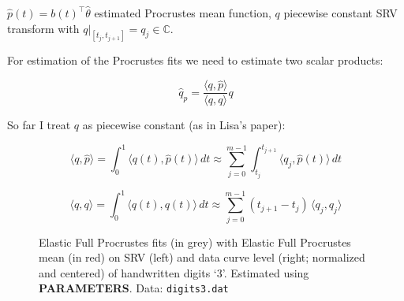 $\hat{p}(t) = b(t)^\top \hat{\theta}$ estimated Procrustes mean function, $q$ piecewise constant SRV transform with $q|_{[t_j, t_{j+1}]} = q_j \in \mathbb{C}$.

For estimation of the Procrustes fits we need to estimate two scalar products:

$$ \hat{q}_{p} = \frac{\langle q,\hat{p} \rangle}{\langle q, q \rangle} q $$

So far I treat $q$ as piecewise constant (as in Lisa's paper):

$$ \langle q, \hat{p} \rangle = \int_0^1 \langle q(t), \hat{p}(t) \rangle \, dt \approx \sum_{j=0}^{m-1} \int_{t_j}^{t_{j+1}} \langle q_j, \hat{p}(t) \rangle \, dt $$

$$ \langle q, q \rangle = \int_0^1 \langle q(t), q(t) \rangle \, dt \approx \sum_{j=0}^{m-1} (t_{j+1} - t_j) \, \langle q_j, q_j \rangle $$

\begin{figure}
  \centering
  \begin{subfigure}{.48\textwidth}
    \centering
  \end{subfigure}\hfill%
  \begin{subfigure}{.48\textwidth}
    \centering
  \end{subfigure}
  \caption{Elastic Full Procrustes fits (in grey) with Elastic Full Procrustes mean (in red) on SRV (left) and data curve level (right; normalized and centered) of handwritten digits \enquote*{3}. Estimated using \textbf{PARAMETERS}. Data: \texttt{digits3.dat}}
  \label{fig:3-pfits}
\end{figure}
